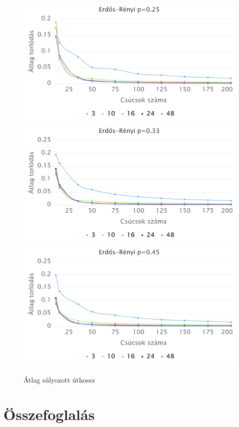 \documentclass[12pt]{report}
\begin{document}
\begin{figure}[h]
	\begin{center}
		\includegraphics[width=0.49\linewidth]{pictures/constant_dan_ratio25_congestion.png}
		\includegraphics[width=0.49\linewidth]{pictures/constant_dan_ratio33_congestion.png}
		\includegraphics[width=0.49\linewidth]{pictures/constant_dan_ratio45_congestion.png}
		\caption{Átlag súlyozott úthossz}
	\end{center}
\end{figure}


\chapter{Összefoglalás}




	
\end{document}
